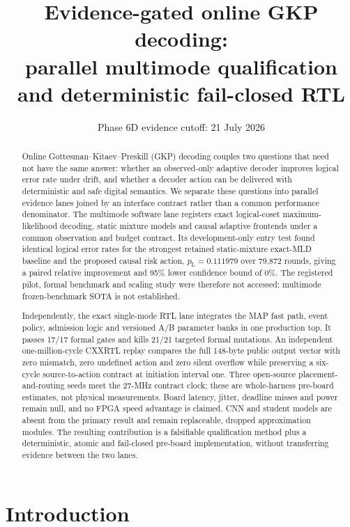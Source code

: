 \documentclass[11pt]{article}
\title{Evidence-gated online GKP decoding:\\
parallel multimode qualification and deterministic fail-closed RTL}
\author{}
\date{Phase 6D evidence cutoff: 21 July 2026}
\newcommand{\pL}{p_{\mathrm L}}
\begin{document}
\maketitle

\begin{abstract}
Online Gottesman--Kitaev--Preskill (GKP) decoding couples two questions that
need not have the same answer: whether an observed-only adaptive decoder
improves logical error rate under drift, and whether a decoder action can be
delivered with deterministic and safe digital semantics.  We separate these
questions into parallel evidence lanes joined by an interface contract rather
than a common performance denominator.  The multimode software lane registers
exact logical-coset maximum-likelihood decoding, static mixture models and
causal adaptive frontends under a common observation and budget contract.  Its
development-only entry test found identical logical error rates for the
strongest retained static-mixture exact-MLD baseline and the proposed causal
risk action, $\pL=0.111979$ over 79,872 rounds, giving a paired relative
improvement and 95\% lower confidence bound of 0\%.  The registered pilot,
formal benchmark and scaling study were therefore not accessed: multimode
frozen-benchmark SOTA is not established.

Independently, the exact single-mode RTL lane integrates the MAP fast path,
event policy, admission logic and versioned A/B parameter banks in one
production top.  It passes 17/17 formal gates and kills 21/21 targeted formal
mutations.  An independent one-million-cycle CXXRTL replay compares the full
148-byte public output vector with zero mismatch, zero undefined action and
zero silent overflow while preserving a six-cycle source-to-action contract
at initiation interval one.  Three open-source placement-and-routing seeds
meet the 27-MHz contract clock; these are whole-harness pre-board estimates,
not physical measurements.  Board latency, jitter, deadline misses and power
remain null, and no FPGA speed advantage is claimed.  CNN and student models
are absent from the primary result and remain replaceable, dropped
approximation modules.  The resulting contribution is a falsifiable
qualification method plus a deterministic, atomic and fail-closed pre-board
implementation, without transferring evidence between the two lanes.
\end{abstract}

\section{Introduction}
\end{document}
